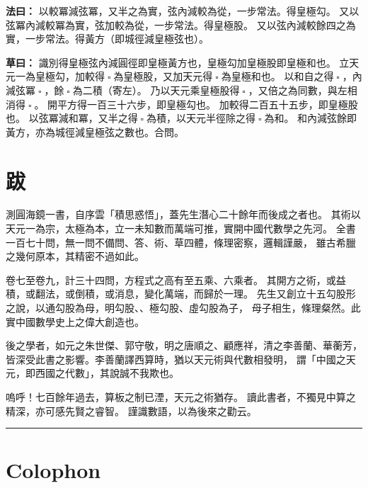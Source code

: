 \documentclass[11pt,a4paper]{article}
\let\origsquare\square
\renewcommand{\square}{\ensuremath{\origsquare}}%
\newcommand{\longline}{\noindent\rule{\textwidth}{0.4pt}}
\newcommand{\fayue}[1]{%
  \par\noindent\textcolor{methodcolor}{\textbf{法曰：}}{\tradfont #1}\par\nopagebreak%
}
\newcommand{\tsaoyue}[1]{%
  \par\noindent\textcolor{workcolor}{\textbf{草曰：}}{\tradfont #1}\par%
}
\begin{document}
\fayue{%
以較冪減弦冪，又半之為實，弦內減較為從，一步常法。得皇極勾。
又以弦冪內減較冪為實，弦加較為從，一步常法。得皇極股。
又以弦內減較餘四之為實，一步常法。得黃方（即城徑減皇極弦也）。}

\tsaoyue{%
識別得皇極弦內減圓徑即皇極黃方也，皇極勾加皇極股即皇極和也。
立天元一為皇極勾，加較得$ \; \square \; $為皇極股，又加天元得$ \; \square \; $為皇極和也。
以和自之得$ \; \square \; $，內減弦冪$ \; \square \; $，餘$ \; \square \; $為二積（寄左）。
乃以天元乘皇極股得$ \; \square \; $，又倍之為同數，與左相消得$ \; \square \; $。
開平方得一百三十六步，即皇極勾也。
加較得二百五十五步，即皇極股也。
以弦冪減和冪，又半之得$ \; \square \; $為積，以天元半徑除之得$ \; \square \; $為和。
和內減弦餘即黃方，亦為城徑減皇極弦之數也。合問。}

\newpage

\section*{跋}

\begin{tradfont}
測圓海鏡一書，自序雲「積思惑悟」，蓋先生潛心二十餘年而後成之者也。
其術以天元一為宗，太極為本，立一未知數而萬端可推，實開中國代數學之先河。
全書一百七十問，無一問不備問、答、術、草四體，條理密察，邏輯謹嚴，
雖古希臘之幾何原本，其精密不過如此。

卷七至卷九，計三十四問，方程式之高有至五乘、六乘者。
其開方之術，或益積，或翻法，或倒積，或消息，變化萬端，而歸於一理。
先生又創立十五勾股形之說，以通勾股為母，明勾股、、極勾股、虛勾股為子，
母子相生，條理粲然。此實中國數學史上之偉大創造也。

後之學者，如元之朱世傑、郭守敬，明之唐順之、顧應祥，清之李善蘭、華蘅芳，
皆深受此書之影響。李善蘭譯西算時，猶以天元術與代數相發明，
謂「中國之天元，即西國之代數」，其說誠不我欺也。

嗚呼！七百餘年過去，算板之制已湮，天元之術猶存。
讀此書者，不獨見中算之精深，亦可感先賢之睿智。
謹識數語，以為後來之勸云。
\end{tradfont}

\vspace{0.5cm}
\begin{center}
\longline
\end{center}

\newpage

\section*{Colophon}
\end{document}
